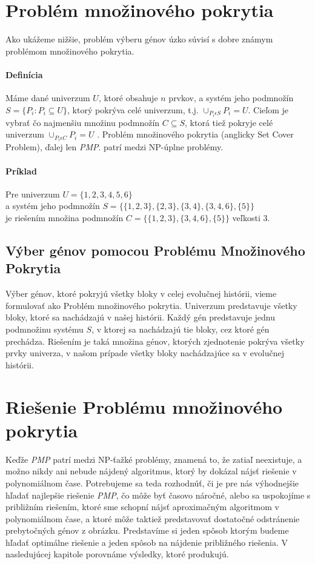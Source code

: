 \section{Problém množinového pokrytia}
Ako ukážeme nižšie, problém výberu génov úzko súvisí s dobre známym problémom množinového pokrytia.
\paragraph{Definícia}
Máme dané univerzum $U$, ktoré obsahuje $n$ prvkov, a systém jeho podmnožín \(S=\{ P_i : P_i \subseteq U \}\), 
ktorý pokrýva celé univerzum, t.j. \(\cup_{P_i \epsilon S} P_i = U\).
Cieľom je vybrať čo najmenšiu množinu podmnožín \(C \subseteq S\),
 ktorá tiež pokryje celé univerzum \(\cup_{P_i \epsilon C} P_i = U \) .
Problém množinového pokrytia (anglicky Set Cover Problem), ďalej len \emph{PMP}. patrí medzi NP-úplne problémy.\cite{Karp}
\paragraph{Príklad}
Pre univerzum $U=\{1,2,3,4,5,6\}$ \\a systém jeho podmnožín
$S=\{\{1,2,3\},\{2,3\},\{3,4\},\{3,4,6\},\{5\}\}$ \\
je riešením množina podmnožín $C=\{\{1,2,3\},\{3,4,6\},\{5\}\}$  veľkosti 3.
\subsection{Výber génov pomocou Problému Množinového Pokrytia}
Výber génov, ktoré pokryjú všetky bloky v celej evolučnej histórii, vieme formulovať
ako Problém množinového pokrytia.
Univerzum predstavuje všetky bloky, ktoré sa nachádzajú v našej histórii.
Každý gén predstavuje jednu podmnožinu systému $S$, v ktorej sa nachádzajú tie bloky, cez ktoré gén prechádza.
Riešením je taká množina génov, ktorých zjednotenie pokrýva všetky prvky univerza, v našom prípade všetky bloky nachádzajúce sa v evolučnej histórii.
\section{Riešenie Problému množinového pokrytia}
Keďže \emph{PMP} patrí medzi NP-ťažké problémy, znamená to, že zatiaľ neexistuje,
a možno nikdy ani nebude nájdený algoritmus, ktorý by dokázal nájsť riešenie v polynomiálnom čase.
Potrebujeme sa teda rozhodnúť, či je pre nás výhodnejšie hľadať najlepšie riešenie \emph{PMP},
čo môže byť časovo náročné,
alebo sa uspokojíme s približním riešením, ktoré sme schopní nájsť aproximačným algoritmom v polynomiálnom čase,
a ktoré môže taktiež predstavovať dostatočné odstránenie prebytočných génov z obrázku.
Predstavíme si jeden spôsob ktorým budeme hľadať optimálne riešenie a jeden spôsob na nájdenie približného riešenia. V
nasledujúcej kapitole porovnáme výsledky, ktoré produkujú. 
